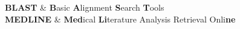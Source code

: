 \documentclass[12pt, twoside]{Thesis} %
\begin{document}
\listoffigures %

\listoftables %


\clearpage %


{
\textbf{BLAST} & \textbf{B}asic \textbf{A}lignment \textbf{S}earch \textbf{T}ools\\
\textbf{MEDLINE} & \textbf{Med}ical \textbf{Li}terature Analysis Retrieval Onli\textbf{ne}
}








\end{document}
